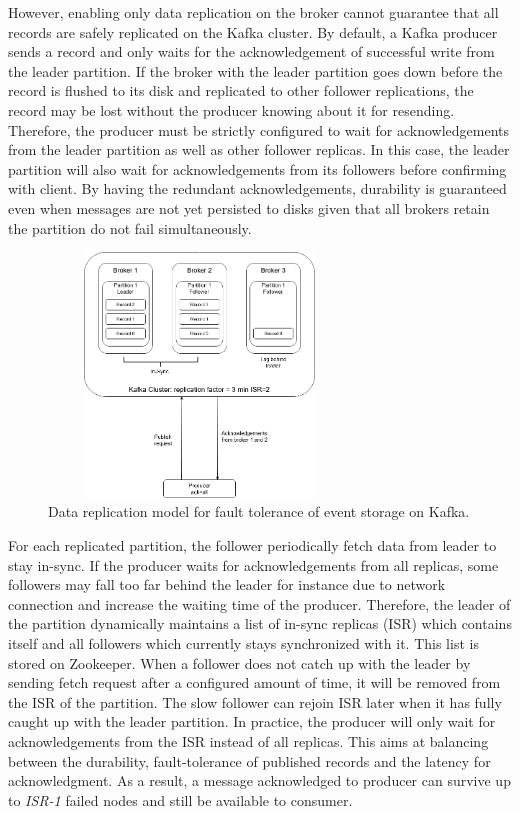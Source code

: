 However, enabling only data replication on the broker cannot guarantee that all records are safely replicated on the Kafka cluster.  By default, a Kafka producer sends a record and only waits for the acknowledgement of successful write from the leader partition. If the broker with the leader partition goes down before the record is flushed to its disk and replicated to other follower replications, the record may be lost without the producer knowing about it for resending. Therefore, the producer must be strictly configured to wait for acknowledgements from the leader partition as well as other follower replicas. In this case, the leader partition will also wait for acknowledgements from its followers before confirming with client. By having the redundant acknowledgements, durability is guaranteed even when messages are not yet persisted to disks given that all brokers retain the partition do not fail simultaneously. 
\begin{figure}[h]
	\centering
	\includegraphics[width=8cm,height=6.5cm]{images/ft-eventstorage-kafka.png}
	\caption{Data replication model for fault tolerance of event storage on Kafka.}
	\label{fig:fteventstorekafka}
\end{figure}

For each replicated partition, the follower periodically fetch data from leader to stay in-sync. If the producer waits for acknowledgements from all replicas, some followers may fall too far behind the leader for instance due to network connection and increase the waiting time of the producer. Therefore, the leader of the partition dynamically maintains a list of in-sync replicas (ISR) which contains itself and all followers which currently stays synchronized with it. This list is stored on Zookeeper. When a follower does not catch up with the leader by sending fetch request after a configured amount of time, it will be removed from the ISR of the partition. The slow follower can rejoin ISR later when it has fully caught up with the leader partition. In practice, the producer will only wait for acknowledgements from the ISR instead of all replicas. This aims at balancing between the durability, fault-tolerance of published records and the latency for acknowledgment. As a result, a message acknowledged to producer can survive up to \emph{ISR-1} failed nodes and still be available to consumer.

